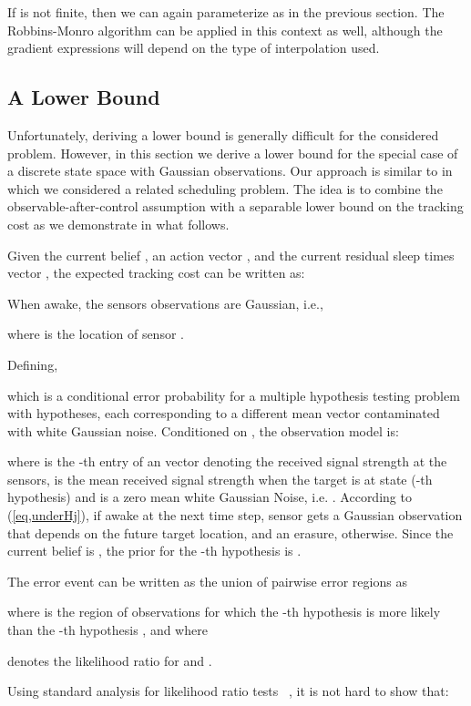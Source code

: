 \documentclass[journal,draftcls,onecolumn,11pt]{IEEEtran}
\begin{document}
If  is not finite, then we can again parameterize  as in the previous section.  The Robbins-Monro algorithm can be applied in this context as well, although the gradient expressions will depend on the type of interpolation used.

\subsection{A Lower Bound}
\label{sec:lower_bound}
Unfortunately, deriving a lower bound is generally difficult for the considered problem. However, in this section we derive a lower bound for the special case of a discrete state space with Gaussian observations. Our approach is similar to \cite{tsp_scheduling} in which we considered a related scheduling problem. The idea is to combine the observable-after-control assumption with a separable lower bound on the tracking cost as we demonstrate in what follows.

Given the current belief , an action vector , and the current residual sleep times vector , the expected tracking cost can be written as:


When awake, the sensors observations are Gaussian, i.e.,

where  is the location of sensor .

Defining,

which is a conditional error probability for a multiple hypothesis testing problem with  hypotheses, each corresponding to a different mean vector contaminated with white Gaussian noise. Conditioned on , the observation model is:

where  is the -th entry of an  vector  denoting the received signal strength at the  sensors,  is the mean received signal strength when the target is at state  (-th hypothesis) and  is a zero mean white Gaussian Noise, i.e. . According to (\ref{eq,underHj}), if awake at the next time step, sensor  gets a Gaussian observation that depends on the future target location, and an erasure, otherwise. Since the current belief is , the prior for the -th hypothesis is .

The error event  can be written as the union of pairwise error regions as

where 
is the region of observations for which the -th hypothesis  is more likely than the -th hypothesis , and where

denotes the likelihood ratio for  and .

Using standard analysis for likelihood ratio tests ~\cite{poor,levy}, it is not hard to show that:
\end{document}
